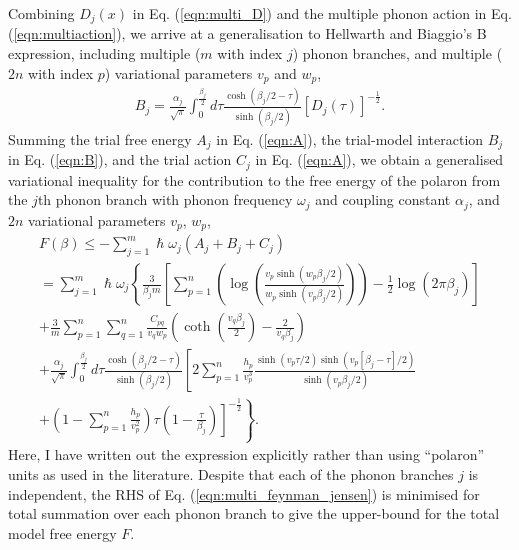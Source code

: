 Combining $D_j(x)$ in Eq. (\ref{eqn:multi_D}) and the multiple phonon action in Eq. (\ref{eqn:multiaction}), we arrive at a generalisation to Hellwarth and Biaggio's B expression, including multiple ($m$ with index $j$) phonon branches, and multiple ($2n$ with index $p$) variational parameters $v_{p}$ and $w_{p}$,
\begin{equation}
\begin{gathered}
    B_j = \frac{\alpha_j}{\sqrt{\pi}} \int_0^{\frac{\beta_j}{2}} d\tau \frac{\cosh (\beta_j / 2 - \tau)}{\sinh(\beta_j / 2)} \left[ D_j(\tau) \right]^{-\frac{1}{2}} .
\label{eqn:B}
\end{gathered}
\end{equation}
Summing the trial free energy $A_j$ in Eq. (\ref{eqn:A}), the trial-model interaction $B_j$ in Eq. (\ref{eqn:B}), and the trial action $C_j$ in Eq. (\ref{eqn:A}), we obtain a generalised variational inequality for the contribution to the free energy of the polaron from the $j$th phonon branch with phonon frequency $\omega_j$ and coupling constant $\alpha_j$, and $2n$ variational parameters $v_{p}$, $w_{p}$, 
\begin{equation} \label{eqn:multi_feynman_jensen}
    \begin{gathered}
         F(\beta) \leq -\sum_{j=1}^m \hslash \omega_j \left(A_j + B_j + C_j\right) \\ = \sum_{j=1}^m \hslash \omega_j \left\{ \frac{3}{\beta_j m} \left[ \sum_{p = 1}^n \left( \log\left(\frac{v_{p} \sinh (w_{p} \beta_j / 2)}{w_{p} \sinh (v_{p} \beta_j / 2)}\right) \right) - \frac{1}{2}\log \left(2\pi\beta_j\right) \right] \right. \\ \left. + \frac{3}{m}\sum_{p = 1}^n \sum_{q = 1}^n \frac{C_{pq}}{v_{q} w_{p}} \left( \coth \left(\frac{v_{q}\beta_j}{2}\right) - \frac{2}{v_{q}\beta_j}\right) \right. \\ 
        \left. + \frac{\alpha_j}{\sqrt{\pi}} \int_0^{\frac{\beta_j}{2}} d\tau \frac{\cosh(\beta_j/2 - \tau)}{\sinh(\beta_j/2)} \left[2 \sum_{p=1}^n \frac{h_{p}}{v_{p}^3} \frac{\sinh{(v_{p} \tau/2)\sinh{(v_{p}[\beta_j-\tau]/2)}}}{\sinh(v_{p}\beta_j/2)} \right. \right.\\
        \left. \left. + \left(1 - \sum_{p = 1}^n \frac{h_{p}}{v_{p}^2}\right) \tau \left(1 - \frac{\tau}{\beta_j}\right) \right]^{-\frac{1}{2}} \right\} .
    \end{gathered}
\end{equation}
Here, I have written out the expression explicitly rather than using ``polaron'' units as used in the literature. Despite that each of the phonon branches $j$ is independent, the RHS of Eq. (\ref{eqn:multi_feynman_jensen}) is minimised for total summation over each phonon branch to give the upper-bound for the total model free energy $F$. 

